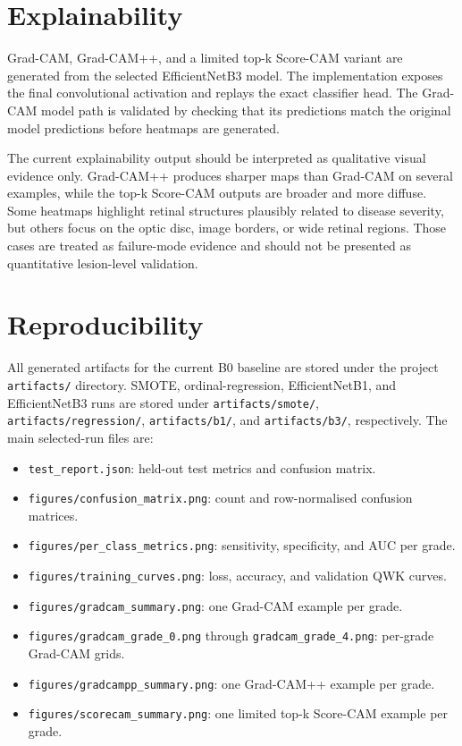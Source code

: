 \documentclass[11pt,a4paper]{article}
\begin{document}
\section{Explainability}
\label{sec:explainability}

Grad-CAM, Grad-CAM++, and a limited top-k Score-CAM variant are generated from
the selected EfficientNetB3 model. The implementation exposes the final
convolutional activation and replays the exact classifier head. The Grad-CAM
model path is validated by checking that its predictions match the original
model predictions before heatmaps are generated.

The current explainability output should be interpreted as qualitative visual
evidence only. Grad-CAM++ produces sharper maps than Grad-CAM on several
examples, while the top-k Score-CAM outputs are broader and more diffuse. Some
heatmaps highlight retinal structures plausibly related to disease severity,
but others focus on the optic disc, image borders, or wide retinal regions.
Those cases are treated as failure-mode evidence and should not be presented as
quantitative lesion-level validation.

\section{Reproducibility}
\label{sec:reproducibility}

All generated artifacts for the current B0 baseline are stored under the project
\texttt{artifacts/} directory. SMOTE, ordinal-regression, EfficientNetB1, and
EfficientNetB3 runs are stored under \texttt{artifacts/smote/},
\texttt{artifacts/regression/}, \texttt{artifacts/b1/}, and
\texttt{artifacts/b3/}, respectively. The main selected-run files are:

\begin{itemize}
  \item \texttt{test\_report.json}: held-out test metrics and confusion matrix.
  \item \texttt{figures/confusion\_matrix.png}: count and row-normalised confusion matrices.
  \item \texttt{figures/per\_class\_metrics.png}: sensitivity, specificity, and AUC per grade.
  \item \texttt{figures/training\_curves.png}: loss, accuracy, and validation QWK curves.
  \item \texttt{figures/gradcam\_summary.png}: one Grad-CAM example per grade.
  \item \texttt{figures/gradcam\_grade\_0.png} through \texttt{gradcam\_grade\_4.png}: per-grade Grad-CAM grids.
  \item \texttt{figures/gradcampp\_summary.png}: one Grad-CAM++ example per grade.
  \item \texttt{figures/scorecam\_summary.png}: one limited top-k Score-CAM example per grade.
\end{itemize}
\end{document}
